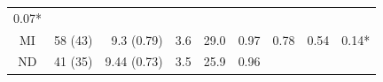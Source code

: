 \begin{longtable}[]{@{}crrrrllrl@{}}
\begin{minipage}[t]{0.07\columnwidth}
0.07*\strut
\end{minipage}\tabularnewline
\begin{minipage}[t]{0.12\columnwidth}\centering\strut
MI\strut
\end{minipage} & \begin{minipage}[t]{0.08\columnwidth}\raggedleft\strut
58 (43)\strut
\end{minipage} & \begin{minipage}[t]{0.13\columnwidth}\raggedleft\strut
9.3 (0.79)\strut
\end{minipage} & \begin{minipage}[t]{0.04\columnwidth}\raggedleft\strut
3.6\strut
\end{minipage} & \begin{minipage}[t]{0.05\columnwidth}\raggedleft\strut
29.0\strut
\end{minipage} & \begin{minipage}[t]{0.11\columnwidth}\raggedright\strut
0.97\strut
\end{minipage} & \begin{minipage}[t]{0.06\columnwidth}\raggedright\strut
0.78\strut
\end{minipage} & \begin{minipage}[t]{0.06\columnwidth}\raggedleft\strut
0.54\strut
\end{minipage} & \begin{minipage}[t]{0.07\columnwidth}\raggedright\strut
0.14*\strut
\end{minipage}\tabularnewline
\begin{minipage}[t]{0.12\columnwidth}\centering\strut
ND\strut
\end{minipage} & \begin{minipage}[t]{0.08\columnwidth}\raggedleft\strut
41 (35)\strut
\end{minipage} & \begin{minipage}[t]{0.13\columnwidth}\raggedleft\strut
9.44 (0.73)\strut
\end{minipage} & \begin{minipage}[t]{0.04\columnwidth}\raggedleft\strut
3.5\strut
\end{minipage} & \begin{minipage}[t]{0.05\columnwidth}\raggedleft\strut
25.9\strut
\end{minipage} & \begin{minipage}[t]{0.11\columnwidth}\raggedright\strut
0.96\strut
\end{minipage} & \begin{minipage}[t]{0.06\columnwidth}\raggedright\strut

\end{minipage}
\end{longtable}
